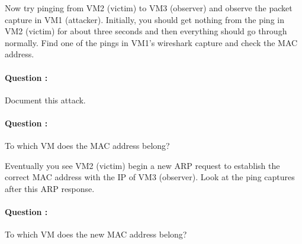 \documentclass{article}
\begin{document}
Now try pinging from VM2 (victim) to VM3 (observer) and observe the packet capture in VM1 (attacker). Initially, you should get nothing from the ping in VM2 (victim) for about three seconds and then everything should go through normally. Find one of the pings in VM1's wireshark capture and check the MAC address.

\paragraph{\textbf{Question :}} Document this attack.\medskip
\addtocounter{Question}{1}

\paragraph{\textbf{Question :}} To which VM does the MAC address belong?\medskip
\addtocounter{Question}{1}

Eventually you see VM2 (victim) begin a new ARP request to establish the correct MAC address with the IP of VM3 (observer). Look at the ping captures after this ARP response.

\paragraph{\textbf{Question :}} To which VM does the new MAC address belong?\medskip
\addtocounter{Question}{1}
\end{document}
